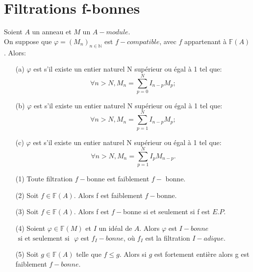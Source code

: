 \section{Filtrations f-bonnes}
\begin{madefinition}
	\label{maprop11}
	Soient $A$ un anneau et $M$ un $A-module$.\\
	On suppose que $\varphi=(M_n)_{n \in \mathbb{N}}$ est $f-compatible$, avec $f $ appartenant à $ \mathbb{F}(A)$. Alors:
	\begin{itemize}
		\item[(a)] $\varphi$ est  s'il existe un entier naturel N supérieur ou égal à 1 tel que:
		\[\forall n > N, M_{n}=\sum_{p=0}^{N}I_{n-p}M_{p}; \]
		\item[(b)] $\varphi$ est  s'il existe un entier naturel N supérieur ou égal à 1 tel que:
		\[\forall n > N, M_{n}=\sum_{p=1}^{N}I_{n-p}M_{p}; \]
		\item[(c)] $\varphi$ est  s'il existe un entier naturel N supérieur ou égal à 1 tel que:
		\[\forall n > N, M_{n}=\sum_{p=1}^{N}I_{p}M_{n-p}. \]
	\end{itemize} 
\end{madefinition}
\begin{maremarque}
	\label{maprop6}
	\begin{enumerate}
		\item[(1)] Toute filtration $f-$bonne est faiblement $f-$ bonne.
		\item[(2)] Soit $f \in \mathbb{F}(A)$. Alors f est faiblement $f-$bonne.
		\item[(3)] Soit $f \in \mathbb{F}(A)$. Alors f est $f-$bonne si et seulement si f est $E.P.$
		\item[(4)] Soient $\varphi \in \mathbb{F}(M)$ et $I$ un idéal de $A$. Alors $\varphi$ est $I-bonne$ $\text{ si et seulement si }$ $\varphi$ est $f_{I}-bonne$, où $f_{I}$ est la filtration $I-adique$.
		\item[(5)] Soit $g \in \mathbb{F}(A)$ telle que $f \leqslant g$. Alors si $g$ est fortement entière alors g est faiblement $f-bonne$.
	\end{enumerate}
\end{maremarque}
